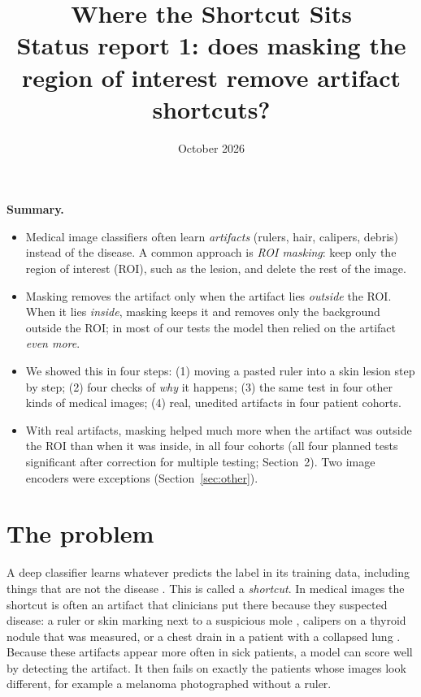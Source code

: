 \documentclass[11pt,a4paper]{article}
\title{\textbf{Where the Shortcut Sits}\\[4pt]\large Status report 1: does masking the region of interest remove
artifact shortcuts?}
\author{}
\date{October 2026}
\newcommand{\keybox}[1]{\par\noindent\colorbox{boxgrey}{\parbox{\dimexpr\linewidth-2\fboxsep}{\small #1}}\par\medskip}
\begin{document}
\maketitle
\vspace{-1.5em}

\keybox{\textbf{Summary.}
\begin{itemize}[leftmargin=1.2em,itemsep=1pt,topsep=2pt]
\item Medical image classifiers often learn \emph{artifacts} (rulers, hair, calipers, debris) instead of the disease.
A common approach is \emph{ROI masking}: keep only the region of interest (ROI), such as the lesion, and delete the
rest of the image.
\item Masking removes the artifact only when the artifact lies \emph{outside} the ROI. When it lies \emph{inside}, masking
keeps it and removes only the background outside the ROI; in most of our tests the model then relied on the artifact \emph{even more}.
\item We showed this in four steps: (1) moving a pasted ruler into a skin lesion step by step; (2) four checks of
\emph{why} it happens; (3) the same test in four other kinds of medical images; (4) real, unedited artifacts in four
patient cohorts.
\item With real artifacts, masking helped much more when the artifact was outside the ROI than when it was inside, in
all four cohorts (all four planned tests significant after correction for multiple testing; Section~2). Two image encoders were
exceptions (Section~\ref{sec:other}).
\end{itemize}}

\section{The problem}
A deep classifier learns whatever predicts the label in its training data, including things that are not the disease
\citep{geirhos2020shortcut}. This is called a \emph{shortcut}. In medical images the shortcut is often an artifact
that clinicians put there because they suspected disease: a ruler or skin marking next to a suspicious mole
\citep{winkler2019markings,winkler2021scalebars}, calipers on a thyroid nodule that was measured, or a chest drain in a
patient with a collapsed lung \citep{jimenez2023shortcuts}. Because these artifacts appear more often in sick patients,
a model can score well by detecting the artifact. It then fails on exactly the patients whose images look different,
for example a melanoma photographed without a ruler.
\end{document}
